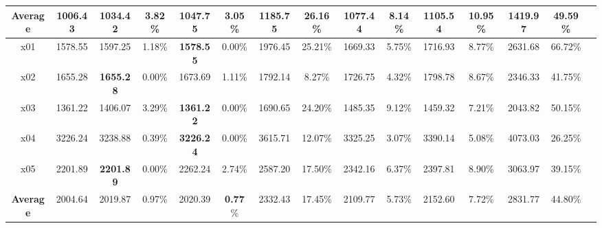\begin{table}[h]
{\begin{tabular}{ccccccccccccccc}
			\midrule
			\textbf{Average} & 1006.43 & 1034.42 & 3.82\% & 1047.75 & \textbf{3.05\%} & 1185.75 & 26.16\% & 1077.44 & 8.14\% & 1105.54 & 10.95\% & 1419.97 & 49.59\% \\
			\bottomrule
			\toprule
			 x01 & 1578.55 & 1597.25 & 1.18\% & \textbf{1578.55} & 0.00\% & 1976.45 & 25.21\% & 1669.33 & 5.75\% & 1716.93 & 8.77\% & 2631.68 & 66.72\% \\
			x02 & 1655.28 & \textbf{1655.28} & 0.00\% & 1673.69 & 1.11\% & 1792.14 & 8.27\% & 1726.75 & 4.32\% & 1798.78 & 8.67\% & 2346.33 & 41.75\% \\
			x03 & 1361.22 & 1406.07 & 3.29\% & \textbf{1361.22} & 0.00\% & 1690.65 & 24.20\% & 1485.35 & 9.12\% & 1459.32 & 7.21\% & 2043.82 & 50.15\% \\
			x04 & 3226.24 & 3238.88 & 0.39\% & \textbf{3226.24} & 0.00\% & 3615.71 & 12.07\% & 3325.25 & 3.07\% & 3390.14 & 5.08\% & 4073.03 & 26.25\% \\
			x05 & 2201.89 & \textbf{2201.89} & 0.00\% & 2262.24 & 2.74\% & 2587.20 & 17.50\% & 2342.16 & 6.37\% & 2397.81 & 8.90\% & 3063.97 & 39.15\% \\
			\midrule
			\textbf{Average} & 2004.64 & 2019.87 & 0.97\% & 2020.39 & \textbf{0.77}\% & 2332.43 & 17.45\% & 2109.77 & 5.73\% & 2152.60 & 7.72\% & 2831.77 & 44.80\% \\
			\bottomrule
		\end{tabular}
	}
	\label{tab:comparison_new}
\end{table}
